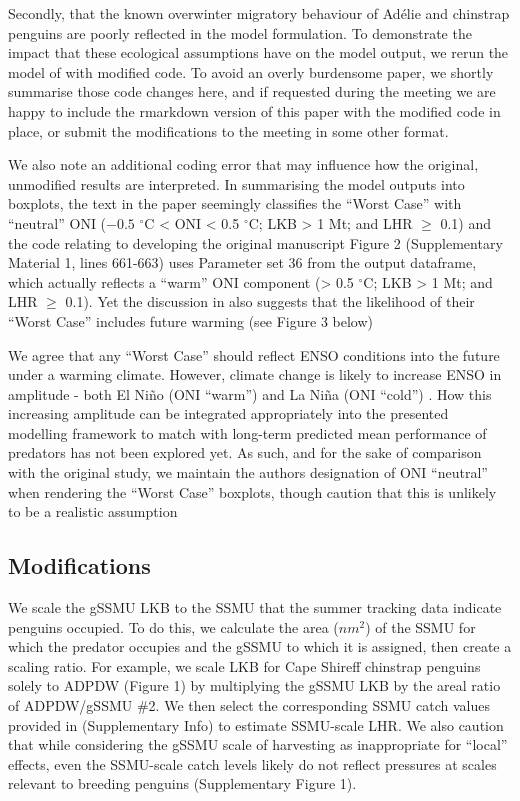 \documentclass[]{elsarticle} %
\begin{document}
Secondly, that the known overwinter migratory behaviour of Adélie and
chinstrap penguins are poorly reflected in the model formulation. To
demonstrate the impact that these ecological assumptions have on the
model output, we rerun the model of \citet{Watters2020} with modified
code. To avoid an overly burdensome paper, we shortly summarise those
code changes here, and if requested during the meeting we are happy to
include the rmarkdown version of this paper with the modified code in
place, or submit the modifications to the meeting in some other format.

We also note an additional coding error that may influence how the
original, unmodified results are interpreted. In summarising the model
outputs into boxplots, the text in the paper seemingly classifies the
``Worst Case'' with ``neutral'' ONI (\({-0.5}\) \(^{\circ}\)C
\textless{} ONI \textless{} 0.5 \(^{\circ}\)C; LKB \textgreater{} 1 Mt;
and LHR \(\geqslant\) 0.1) and the code relating to developing the
original manuscript Figure 2 (Supplementary Material 1, lines 661-663)
uses Parameter set 36 from the output dataframe, which actually reflects
a ``warm'' ONI component (\textgreater{} 0.5 \(^{\circ}\)C; LKB
\textgreater{} 1 Mt; and LHR \(\geqslant\) 0.1). Yet the discussion in
\citet{Watters2020} also suggests that the likelihood of their ``Worst
Case'' includes future warming (see Figure 3 below)

We agree that any ``Worst Case'' should reflect ENSO conditions into the
future under a warming climate. However, climate change is likely to
increase ENSO in amplitude - both El Niño (ONI ``warm'') and La Niña
(ONI ``cold'') \citep{capotondiUnderstandingENSODiversity2015}. How this
increasing amplitude can be integrated appropriately into the presented
modelling framework to match with long-term predicted mean performance
of predators has not been explored yet. As such, and for the sake of
comparison with the original study, we maintain the authors designation
of ONI ``neutral'' when rendering the ``Worst Case'' boxplots, though
caution that this is unlikely to be a realistic assumption

\subsection{Modifications}\label{modifications}

We scale the gSSMU LKB to the SSMU that the summer tracking data
indicate penguins occupied. To do this, we calculate the area (\(nm^2\))
of the SSMU for which the predator occupies and the gSSMU to which it is
assigned, then create a scaling ratio. For example, we scale LKB for
Cape Shireff chinstrap penguins solely to ADPDW (Figure 1) by
multiplying the gSSMU LKB by the areal ratio of ADPDW/gSSMU \#2. We then
select the corresponding SSMU catch values provided in
\citet{Watters2020} (Supplementary Info) to estimate SSMU-scale LHR. We
also caution that while considering the gSSMU scale of harvesting as
inappropriate for ``local'' effects, even the SSMU-scale catch levels
likely do not reflect pressures at scales relevant to breeding penguins
(Supplementary Figure 1).
\end{document}
